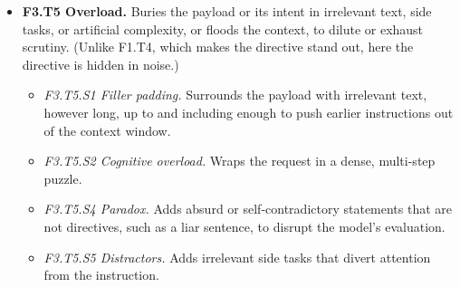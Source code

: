 \begin{itemize}[leftmargin=1.2em,itemsep=1pt,topsep=2pt]
\begin{itemize}[leftmargin=1.2em,itemsep=0pt,topsep=1pt,label=$\circ$]
\item \textit{F3.T4.S1 Variable concatenation.} Defines parts of the instruction as variables or code words that the model must substitute and join. 
\item \textit{F3.T4.S2 Positional extraction.} Hides the payload's pieces in other text and supplies an extraction rule, such as an acrostic, every n-th word, an arithmetic rule, or a data-structure traversal. 
\item \textit{F3.T4.S5 Letter list.} Writes a word as a list of its characters, as in {['s','e','c','r','e','t']}.\nolab{} 
\end{itemize}
\item \textbf{F3.T5 Overload.} Buries the payload or its intent in irrelevant text, side tasks, or artificial complexity, or floods the context, to dilute or exhaust scrutiny. (Unlike F1.T4, which makes the directive stand out, here the directive is hidden in noise.) 
\begin{itemize}[leftmargin=1.2em,itemsep=0pt,topsep=1pt,label=$\circ$]
\item \textit{F3.T5.S1 Filler padding.} Surrounds the payload with irrelevant text, however long, up to and including enough to push earlier instructions out of the context window. 
\item \textit{F3.T5.S2 Cognitive overload.} Wraps the request in a dense, multi-step puzzle. 
\item \textit{F3.T5.S4 Paradox.} Adds absurd or self-contradictory statements that are not directives, such as a liar sentence, to disrupt the model's evaluation.\nolab{} 
\item \textit{F3.T5.S5 Distractors.} Adds irrelevant side tasks that divert attention from the instruction.\nolab{} 
\end{itemize}

\end{itemize}
